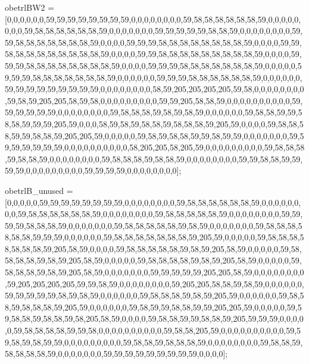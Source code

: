 obetrlBW2 = [0,0,0,0,0,0,59,59,59,59,59,59,59,59,0,0,0,0,0,0,0,0,59,58,58,58,58,58,58,59,0,0,0,0,0,0,0,0,59,58,58,58,58,58,58,59,0,0,0,0,0,0,0,59,59,59,59,59,58,58,59,0,0,0,0,0,0,0,0,59,59,58,58,58,58,58,58,58,59,0,0,0,0,59,59,59,58,58,58,58,58,58,58,58,59,0,0,0,0,59,59,58,58,58,58,58,58,58,58,58,59,0,0,0,0,59,59,58,58,58,58,58,58,58,58,58,59,0,0,0,0,59,59,59,58,58,58,58,58,58,58,58,59,0,0,0,0,59,59,59,58,58,58,58,58,58,58,59,0,0,0,0,0,59,59,59,58,58,58,58,58,58,58,59,0,0,0,0,0,0,59,59,59,58,58,58,58,58,58,59,0,0,0,0,0,0,59,59,59,59,59,59,59,59,59,0,0,0,0,0,0,0,0,58,59,205,205,205,205,59,58,0,0,0,0,0,0,0,0,59,58,59,205,205,58,59,58,0,0,0,0,0,0,0,0,0,59,59,205,58,58,59,0,0,0,0,0,0,0,0,0,0,59,59,59,59,59,59,0,0,0,0,0,0,0,0,59,58,58,58,59,58,59,58,59,0,0,0,0,0,0,59,58,58,59,59,58,58,59,59,59,205,59,0,0,0,58,59,58,59,58,58,59,58,58,58,59,205,59,0,0,0,0,59,58,58,58,59,59,58,58,59,205,205,59,0,0,0,0,0,59,58,59,58,58,59,59,58,59,59,0,0,0,0,0,0,0,59,59,59,59,59,59,59,0,0,0,0,0,0,0,0,0,0,58,205,205,58,205,59,0,0,0,0,0,0,0,0,0,59,58,58,58,59,58,58,59,0,0,0,0,0,0,0,0,59,58,58,58,59,58,58,59,0,0,0,0,0,0,0,0,59,59,58,58,59,59,59,59,0,0,0,0,0,0,0,0,0,59,59,59,59,0,0,0,0,0,0,0,0];

obetrlB_unused = [0,0,0,0,0,59,59,59,59,59,59,59,59,0,0,0,0,0,0,0,0,59,58,58,58,58,58,58,59,0,0,0,0,0,0,0,0,59,58,58,58,58,58,58,59,0,0,0,0,0,0,0,0,59,58,58,58,58,58,59,0,0,0,0,0,0,0,0,59,59,59,59,58,58,58,59,0,0,0,0,0,0,0,59,58,58,58,58,58,59,58,59,0,0,0,0,0,0,0,59,58,58,58,58,58,58,59,59,59,0,0,0,0,0,0,59,58,58,58,58,58,58,58,59,205,59,0,0,0,0,0,59,58,58,58,58,58,58,58,59,205,58,59,0,0,0,0,59,58,58,58,58,58,59,58,59,205,58,59,0,0,0,0,0,59,58,58,58,58,59,58,59,205,58,59,0,0,0,0,0,59,58,58,58,58,59,58,59,205,58,59,0,0,0,0,0,59,58,58,58,59,58,59,205,58,59,0,0,0,0,0,0,0,59,59,59,59,59,205,205,58,59,0,0,0,0,0,0,0,0,59,205,205,205,205,59,59,58,59,0,0,0,0,0,0,0,0,59,205,205,58,58,59,58,59,0,0,0,0,0,0,59,59,59,59,59,58,59,58,59,0,0,0,0,0,0,59,58,58,58,59,58,59,205,59,0,0,0,0,0,0,59,58,58,59,58,58,58,59,205,59,0,0,0,0,0,0,59,58,59,59,58,58,59,59,205,205,59,0,0,0,0,0,59,59,58,58,59,58,58,59,58,205,58,59,0,0,0,0,59,58,58,59,59,58,58,59,205,59,59,59,0,0,0,0,0,59,58,58,58,58,59,59,58,0,0,0,0,0,0,0,0,0,0,59,58,58,205,59,0,0,0,0,0,0,0,0,0,0,59,59,58,59,58,59,59,0,0,0,0,0,0,0,0,0,59,58,58,59,58,58,58,59,0,0,0,0,0,0,0,0,59,58,58,59,58,58,58,58,59,0,0,0,0,0,0,0,59,59,59,59,59,59,59,59,59,0,0,0,0];


